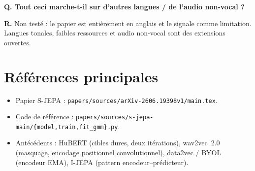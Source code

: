 \documentclass[11pt,a4paper]{article}
\newcommand{\faq}[2]{%
  \par\medskip
  \begin{faqbox}
  \textbf{Q. #1}\par\smallskip
  \textbf{R.} #2
  \end{faqbox}
}
\newcommand{\file}[1]{\texttt{#1}}
\begin{document}
\faq{Tout ceci marche-t-il sur d'autres langues / de l'audio non-vocal ?}{%
Non testé : le papier est entièrement en anglais et le signale comme
limitation. Langues tonales, faibles ressources et audio non-vocal sont
des extensions ouvertes.}

\section*{Références principales}
\begin{itemize}[leftmargin=*]
  \item Papier S-JEPA : \file{papers/sources/arXiv-2606.19398v1/main.tex}.
  \item Code de référence :
  \file{papers/sources/s-jepa-main/\{model,train,fit\_gmm\}.py}.
  \item Antécédents : HuBERT (cibles dures, deux itérations),
  wav2vec~2.0 (masquage, encodage positionnel convolutionnel),
  data2vec / BYOL (encodeur EMA), I-JEPA (pattern encodeur--prédicteur).
\end{itemize}
\end{document}
